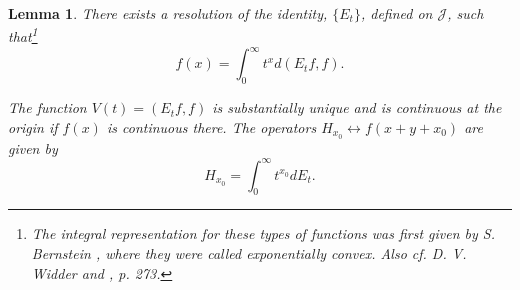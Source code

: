\documentclass{article}
\newtheorem{lemma}{Lemma}
\begin{document}
\begin{lemma}
\label{lem:spectral-representation}
There exists a resolution of the identity, $\{E_t\}$, defined on $\mathcal{J}$, such that\footnote{The integral representation for these types of functions was first given by S. Bernstein \cite{bernstein}, where they were called exponentially convex. Also cf. D. V. Widder \cite{widder2} and \cite{widder3}, p. 273.}
\begin{equation}
f(x) = \int_0^{\infty} t^x d(E_t f, f).
\label{eq:spectral-integral}
\end{equation}

The function $V(t) = (E_t f, f)$ is substantially unique and is continuous at the origin if $f(x)$ is continuous there. The operators $H_{x_0} \leftrightarrow f(x+y+x_0)$ are given by
\begin{equation}
H_{x_0} = \int_0^{\infty} t^{x_0} dE_t.
\label{eq:operator-representation}
\end{equation}
\end{lemma}
\end{document}
